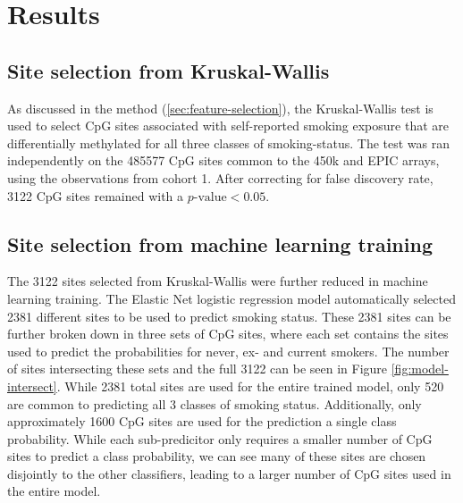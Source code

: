 \documentclass{article}
\begin{document}
\section{Results} \label{sec:results}

\subsection{Site selection from Kruskal-Wallis}
As discussed in the method (\ref{sec:feature-selection}), the Kruskal-Wallis test is used to select CpG sites associated with self-reported smoking exposure that are differentially methylated for all three classes of smoking-status. The test was ran independently on the \num{485577} CpG sites common to the 450k and EPIC arrays, using the observations from cohort 1. After correcting for false discovery rate, \num{3122} CpG sites remained with a \(p\text{-value} < 0.05\).


\subsection{Site selection from machine learning training}
The \num{3122} sites selected from Kruskal-Wallis were further reduced in machine learning training. The Elastic Net logistic regression model automatically selected \num{2381} different sites to be used to predict smoking status. These \num{2381} sites can be further broken down in three sets of CpG sites, where each set contains the sites used to predict the probabilities for never, ex- and current smokers. The number of sites intersecting these sets and the full \num{3122} can be seen in Figure \ref{fig:model-intersect}. While \num{2381} total sites are used for the entire trained model, only \num{520} are common to predicting all 3 classes of smoking status. Additionally, only approximately 1600 CpG sites are used for the prediction a single class probability. While each sub-predicitor only requires a smaller number of CpG sites to predict a class probability, we can see many of these sites are chosen disjointly to the other classifiers, leading to a larger number of CpG sites used in the entire model. 
\end{document}

